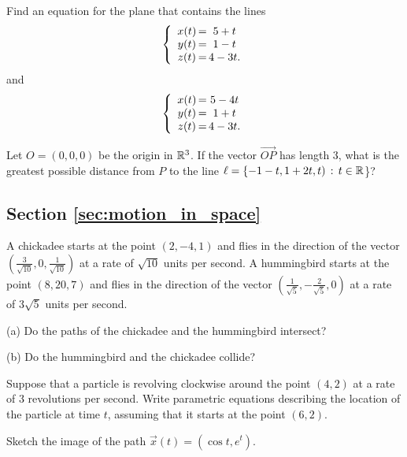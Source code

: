 \documentclass[svgnames]{watsonbook}
\begin{document}
\begin{exercise}{}{}
  Find an equation for the plane that contains the lines
\[
\left\{
\begin{array}{c@{\,}c@{\,}c}
  x(t)&=&5+t \\
  y(t)&=&1-t \\
  z(t)&=&4-3t. 
\end{array}
\right.
\]
and
\[
\left\{
\begin{array}{c@{\,}c@{\,}c}
  x(t)&=&5-4t \\
  y(t)&=&1+t \\
  z(t)&=&4-3t. 
\end{array}
\right.
\]
\end{exercise}

\begin{exercise}{}{}
  Let $O=(0,0,0)$ be the origin in $\mathbb{R}^3$. If the vector
  $\overrightarrow{OP}$ has length 3, what is the greatest possible
  distance from $P$ to the line
  $\ell = \{-1-t,1+2t,t) \,:\, t\in \mathbb{R}$\}?
\end{exercise}

\newpage 

\subsection*{Section \ref{sec:motion_in_space}}

\begin{exercise}{}{}
A chickadee starts at the point $(2,-4,1)$ and flies in the direction of the vector $\left(\frac{3}{\sqrt{10}},0,\frac{1}{\sqrt{10}}\right)$ at a rate of $\sqrt{10}$ units per second. A hummingbird starts at the point $(8,20,7)$ and flies in the direction of the vector $\left(\frac{1}{\sqrt{5}},-\frac{2}{\sqrt{5}},0\right)$ at a rate of $3\sqrt{5}$ units per second.

(a) Do the paths of the chickadee and the hummingbird intersect? 

(b) Do the hummingbird and the chickadee collide?
\end{exercise}

\begin{exercise}{}{}
  Suppose that a particle is revolving clockwise around the point
  $(4,2)$ at a rate of 3 revolutions per second. Write parametric
  equations describing the location of the particle at time $t$,
  assuming that it starts at the point $(6,2)$.
\end{exercise}

\begin{exercise}{}{}
  Sketch the image of the path $\vec{x}(t)=(\cos t, e^t)$.
\end{exercise}
\end{document}

